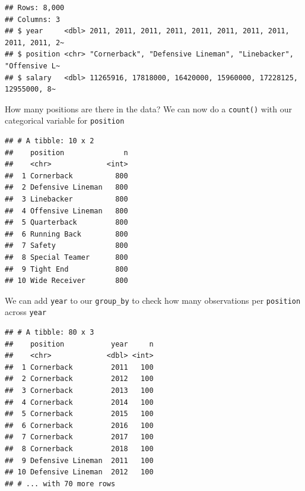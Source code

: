 \documentclass[
]{book}
\newenvironment{Shaded}{\begin{snugshade}}{\end{snugshade}}
\newcommand{\KeywordTok}[1]{\textcolor[rgb]{0.13,0.29,0.53}{\textbf{#1}}}
\newcommand{\NormalTok}[1]{#1}
\newcommand{\OperatorTok}[1]{\textcolor[rgb]{0.81,0.36,0.00}{\textbf{#1}}}
\newcommand{\StringTok}[1]{\textcolor[rgb]{0.31,0.60,0.02}{#1}}
\begin{document}
\begin{verbatim}
## Rows: 8,000
## Columns: 3
## $ year     <dbl> 2011, 2011, 2011, 2011, 2011, 2011, 2011, 2011, 2011, 2011, 2~
## $ position <chr> "Cornerback", "Defensive Lineman", "Linebacker", "Offensive L~
## $ salary   <dbl> 11265916, 17818000, 16420000, 15960000, 17228125, 12955000, 8~
\end{verbatim}

How many positions are there in the data? We can now do a \texttt{count()} with our categorical variable for \texttt{position}

\begin{Shaded}
\end{Shaded}

\begin{verbatim}
## # A tibble: 10 x 2
##    position              n
##    <chr>             <int>
##  1 Cornerback          800
##  2 Defensive Lineman   800
##  3 Linebacker          800
##  4 Offensive Lineman   800
##  5 Quarterback         800
##  6 Running Back        800
##  7 Safety              800
##  8 Special Teamer      800
##  9 Tight End           800
## 10 Wide Receiver       800
\end{verbatim}

We can add \texttt{year} to our \texttt{group\_by} to check how many observations per \texttt{position} across \texttt{year}

\begin{Shaded}
\end{Shaded}

\begin{verbatim}
## # A tibble: 80 x 3
##    position           year     n
##    <chr>             <dbl> <int>
##  1 Cornerback         2011   100
##  2 Cornerback         2012   100
##  3 Cornerback         2013   100
##  4 Cornerback         2014   100
##  5 Cornerback         2015   100
##  6 Cornerback         2016   100
##  7 Cornerback         2017   100
##  8 Cornerback         2018   100
##  9 Defensive Lineman  2011   100
## 10 Defensive Lineman  2012   100
## # ... with 70 more rows
\end{verbatim}
\end{document}
